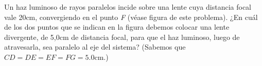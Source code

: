 
Un haz luminoso de rayos paralelos incide sobre una lente cuya distancia focal vale 20cm, convergiendo en el punto \textit{F} (véase figura de este problema). ¿En cuál de los dos puntos que se indican en la figura debemos colocar una lente divergente, de 5,0cm de distancia focal, para que el haz luminoso, luego de atravesarla, sea paralelo al eje del sistema? (Sabemos que $CD=DE=EF=FG=5.0$cm.)
